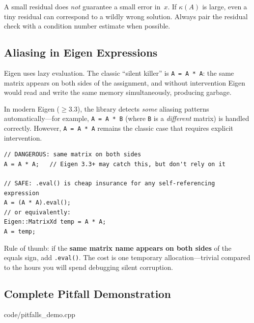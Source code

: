 \begin{warningbox}
A small residual does \emph{not} guarantee a small error in~$x$.
If $\kappa(A)$ is large, even a tiny residual can correspond to
a wildly wrong solution.  Always pair the residual check with
a condition number estimate when possible.
\end{warningbox}

\subsection{Aliasing in Eigen Expressions}

Eigen uses lazy evaluation.  The classic ``silent killer'' is
\texttt{A = A * A}: the same matrix appears on both sides of the
assignment, and without intervention Eigen would read and write
the same memory simultaneously, producing garbage.

In modern Eigen ($\ge 3.3$), the library detects \emph{some}
aliasing patterns automatically---for example,
\texttt{A = A * B} (where \texttt{B} is a \emph{different} matrix)
is handled correctly.  However, \texttt{A = A * A} remains the
classic case that requires explicit intervention.

\begin{lstlisting}
// DANGEROUS: same matrix on both sides
A = A * A;   // Eigen 3.3+ may catch this, but don't rely on it

// SAFE: .eval() is cheap insurance for any self-referencing expression
A = (A * A).eval();
// or equivalently:
Eigen::MatrixXd temp = A * A;
A = temp;
\end{lstlisting}

\begin{tipbox}
Rule of thumb: if the \textbf{same matrix name appears on both sides}
of the equals sign, add \texttt{.eval()}.  The cost is one temporary
allocation---trivial compared to the hours you will spend debugging
silent corruption.
\end{tipbox}

\subsection{Complete Pitfall Demonstration}


                {code/pitfalls_demo.cpp}
